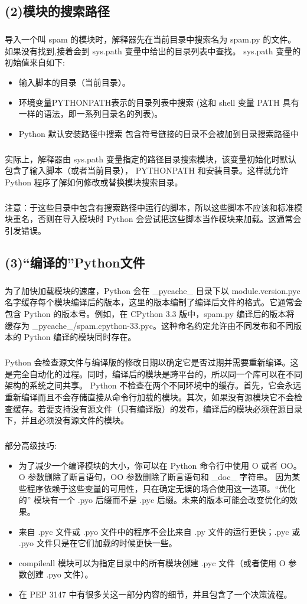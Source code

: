 \documentclass{article}
\begin{document}
\begin{CJK}{UTF8}{gbsn}
\subsection*{(2)模块的搜索路径}
\subparagraph*{}
导入一个叫 spam 的模块时，解释器先在当前目录中搜索名为 spam.py 的文件。如果没有找到,接着会到 sys.path 变量中给出的目录列表中查找。 sys.path 变量的初始值来自如下:
\begin{itemize}
   \item 输入脚本的目录（当前目录）。
   \item 环境变量PYTHONPATH表示的目录列表中搜索
   (这和 shell 变量 PATH 具有一样的语法，即一系列目录名的列表)。
   \item Python 默认安装路径中搜索
   包含符号链接的目录不会被加到目录搜索路径中
\end{itemize}
\subparagraph*{}
实际上，解释器由 sys.path 变量指定的路径目录搜索模块，该变量初始化时默认包含了输入脚本（或者当前目录）， PYTHONPATH 和安装目录。这样就允许 Python 程序了解如何修改或替换模块搜索目录。
\subparagraph*{}
注意：于这些目录中包含有搜索路径中运行的脚本，所以这些脚本不应该和标准模块重名，否则在导入模块时 Python 会尝试把这些脚本当作模块来加载。这通常会引发错误。
\subsection*{(3)“编译的”Python文件}
\subparagraph*{}
为了加快加载模块的速度，Python 会在 \_{}pycache\_{} 目录下以 module.version.pyc 名字缓存每个模块编译后的版本，这里的版本编制了编译后文件的格式。它通常会包含 Python 的版本号。例如，在 CPython 3.3 版中，spam.py 编译后的版本将缓存为 \_{}pycache\_{}/spam.cpython-33.pyc。这种命名约定允许由不同发布和不同版本的 Python 编译的模块同时存在。
\subparagraph*{}
Python 会检查源文件与编译版的修改日期以确定它是否过期并需要重新编译。这是完全自动化的过程。同时，编译后的模块是跨平台的，所以同一个库可以在不同架构的系统之间共享。
Python 不检查在两个不同环境中的缓存。首先，它会永远重新编译而且不会存储直接从命令行加载的模块。其次，如果没有源模块它不会检查缓存。若要支持没有源文件（只有编译版）的发布，编译后的模块必须在源目录下，并且必须没有源文件的模块。
\subparagraph*{}
部分高级技巧:
\begin{itemize}
   \item 为了减少一个编译模块的大小，你可以在 Python 命令行中使用 \-{}O 或者 \-{}OO。\-{}O 参数删除了断言语句，\-{}OO 参数删除了断言语句和 \_{}doc\_{} 字符串。
   因为某些程序依赖于这些变量的可用性，只在确定无误的场合使用这一选项。“优化的” 模块有一个 .pyo 后缀而不是 .pyc 后缀。未来的版本可能会改变优化的效果。
   \item 来自 .pyc 文件或 .pyo 文件中的程序不会比来自 .py 文件的运行更快；.pyc 或 .pyo 文件只是在它们加载的时候更快一些。
   \item compileall 模块可以为指定目录中的所有模块创建 .pyc 文件（或者使用 \-{}O 参数创建 .pyo 文件）。
   \item 在 PEP 3147 中有很多关这一部分内容的细节，并且包含了一个决策流程。
\end{itemize}

\end{CJK}
\end{document}
